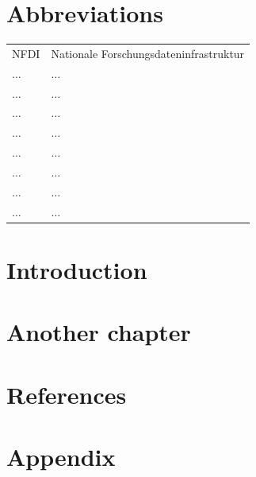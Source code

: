 \documentclass[headsepline,titlepage,twoside,12pt]{scrreprt}
\begin{document}
\chapter*{Abbreviations}
\begin{tabularx}{\textwidth}{lX}
NFDI					&Nationale Forschungsdateninfrastruktur\\
$\ldots$				&$\ldots$\\
$\ldots$				&$\ldots$\\
$\ldots$				&$\ldots$\\
$\ldots$				&$\ldots$\\
$\ldots$				&$\ldots$\\
$\ldots$				&$\ldots$\\
$\ldots$				&$\ldots$\\
$\ldots$				&$\ldots$\\
\end{tabularx}

\tableofcontents

\chapter{Introduction}\label{ch:introduction}

\chapter{Another chapter}\label{ch:anotherchapter}


\chapter{References}\label{ch:references}



\chapter{Appendix}\label{ch:appendix}
\end{document}
